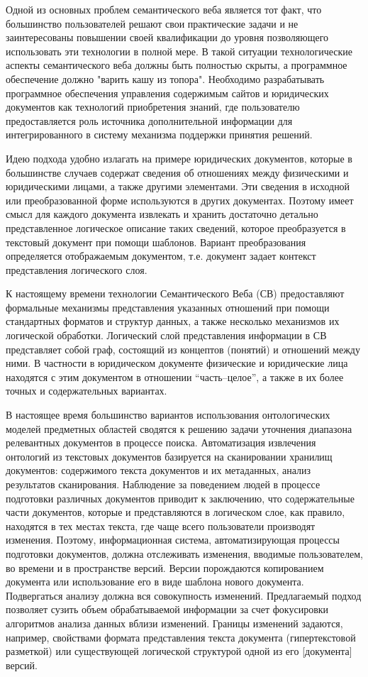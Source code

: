 \documentclass[utf8]{../IncArticle}
\newcommand{\e}[2][fcolor]{\textcolor{pcolor}{[}\textcolor{#1}{#2}\textcolor{pcolor}{]}}
\begin{document}
Одной из основных проблем семантического веба является тот факт, что
большинство пользователей решают свои практические задачи и не
заинтересованы повышении своей квалификации до уровня позволяющего
использовать эти технологии в полной мере.  В такой ситуации
технологические аспекты семантического веба должны быть полностью
скрыты, а программное обеспечение должно "варить кашу из
топора".  Необходимо разрабатывать программное обеспечения управления
содержимым сайтов и юридических документов как технологий приобретения
знаний, где пользователю предоставляется роль источника дополнительной
информации для интегрированного в систему механизма поддержки принятия
решений.

Идею подхода удобно излагать на примере юридических документов,
которые в большинстве случаев содержат сведения об отношениях между
физическими и юридическими лицами, а также другими элементами.  Эти
сведения в исходной или преобразованной форме используются в других
документах.  Поэтому имеет смысл для каждого документа извлекать и
хранить достаточно детально представленное логическое описание таких
сведений, которое преобразуется в текстовый документ при помощи
шаблонов.  Вариант преобразования определяется отображаемым документом,
т.е. документ задает контекст представления логического слоя.

К настоящему времени технологии Семантического Веба (СВ) предоставляют
формальные механизмы представления указанных отношений при помощи
стандартных форматов и структур данных, а также несколько механизмов
их логической обработки.  Логический слой представления информации в СВ
представляет собой граф, состоящий из концептов (понятий) и отношений
между ними.  В частности в юридическом документе физические и
юридические лица находятся с этим документом в отношении
``часть--целое'', а также в их более точных и содержательных вариантах.

В настоящее время большинство вариантов использования онтологических
моделей предметных областей сводятся к решению задачи уточнения
диапазона релевантных документов в процессе поиска.  Автоматизация
извлечения онтологий из текстовых документов базируется на
сканировании хранилищ документов: содержимого текста документов и их
метаданных, анализ результатов сканирования.  Наблюдение за поведением
людей в процессе подготовки различных документов приводит к
заключению, что содержательные части документов, которые и
представляются в логическом слое, как правило, находятся в тех местах
текста, где чаще всего пользователи производят изменения.  Поэтому,
информационная система, автоматизирующая процессы подготовки
документов, должна отслеживать изменения, вводимые пользователем, во
времени и в пространстве версий.  Версии порождаются копированием
документа или использование его в виде шаблона нового
документа.  Подвергаться анализу должна вся совокупность
изменений.  Предлагаемый подход позволяет сузить объем обрабатываемой
информации за счет фокусировки алгоритмов анализа данных вблизи
изменений.  Границы изменений задаются, например, свойствами формата
представления текста документа (гипертекстовой разметкой) или
существующей логической структурой одной из его \e{документа} версий.
\end{document}

